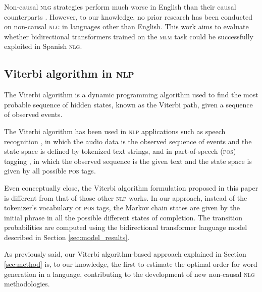Non-causal \textsc{nlg} strategies perform much worse in English than their causal counterparts \citep{Wang2019a}. However, to our knowledge, no prior research has been conducted on non-causal \textsc{nlg} in languages other than English. This work aims to evaluate whether bidirectional transformers trained on the \textsc{mlm} task could be successfully exploited in Spanish \textsc{nlg}.

\subsection{Viterbi algorithm in \textsc{nlp} }
The Viterbi algorithm \citep{Forney1973} is a dynamic programming algorithm used to find the most probable sequence of hidden states, known as the Viterbi path, given a sequence of observed events.

The Viterbi algorithm has been used in \textsc{nlp} applications such as speech recognition \citep{Jo2019,Raj2022}, in which the audio data is the observed sequence of events and the state space is defined by tokenized text strings, and in part-of-speech (\textsc{pos}) tagging \citep{Pattnaik2020}, in which the observed sequence is the given text and the state space is given by all possible \textsc{pos} tags. 

Even conceptually close, the Viterbi algorithm formulation proposed in this paper is different from that of those other \textsc{nlp} works. In our approach, instead of the tokenizer's vocabulary or \textsc{pos} tags, the Markov chain states are given by the initial phrase in all the possible different states of completion. The transition probabilities are computed using the bidirectional transformer language model described in Section \ref{sec:model_results}.

As previously said, our Viterbi algorithm-based approach explained in Section \ref{sec:method} is, to our knowledge, the first to estimate the optimal order for word generation in a language, contributing to the development of new non-causal \textsc{nlg} methodologies.